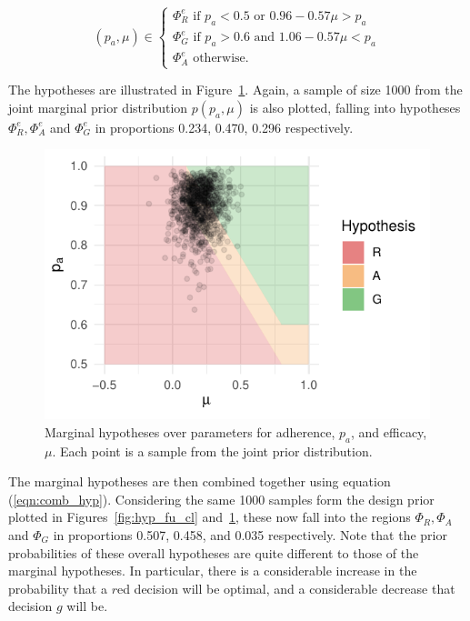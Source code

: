 \documentclass{article} %
\begin{document}
\begin{equation}
  (p_{a}, \mu) \in \begin{cases}
               \Phi^e_R \text{ if } p_{a} < 0.5 \text{ or } 0.96-0.57\mu > p_{a} \\
               \Phi^e_G \text{ if } p_{a} > 0.6 \text{ and } 1.06-0.57\mu < p_{a} \\
               \Phi^e_A \text{ otherwise.}
            \end{cases}
\end{equation}

The hypotheses are illustrated in Figure~\ref{fig:hyp_ad_eff}. Again, a sample of size 1000 from the joint marginal prior distribution $p(p_{a}, \mu)$ is also plotted, falling into hypotheses $\Phi^e_R, \Phi^e_A$ and $\Phi^e_G$ in proportions 0.234, 0.470, 0.296 respectively.

\begin{figure}
\centering
\includegraphics[scale=0.7]{./Figures/hyp_ad_eff}
\caption{Marginal hypotheses over parameters for adherence, $p_{a}$, and efficacy, $\mu$. Each point is a sample from the joint prior distribution.}
\label{fig:hyp_ad_eff}
\end{figure}

The marginal hypotheses are then combined together using equation (\ref{eqn:comb_hyp}). Considering the same 1000 samples form the design prior plotted in Figures~\ref{fig:hyp_fu_cl} and~\ref{fig:hyp_ad_eff}, these now fall into the regions $\Phi_R, \Phi_A$ and $\Phi_G$ in proportions 0.507, 0.458, and 0.035 respectively. Note that the prior probabilities of these overall hypotheses are quite different to those of the marginal hypotheses. In particular, there is a considerable increase in the probability that a $r$ed decision will be optimal, and a considerable decrease that decision $g$ will be.
\end{document}
